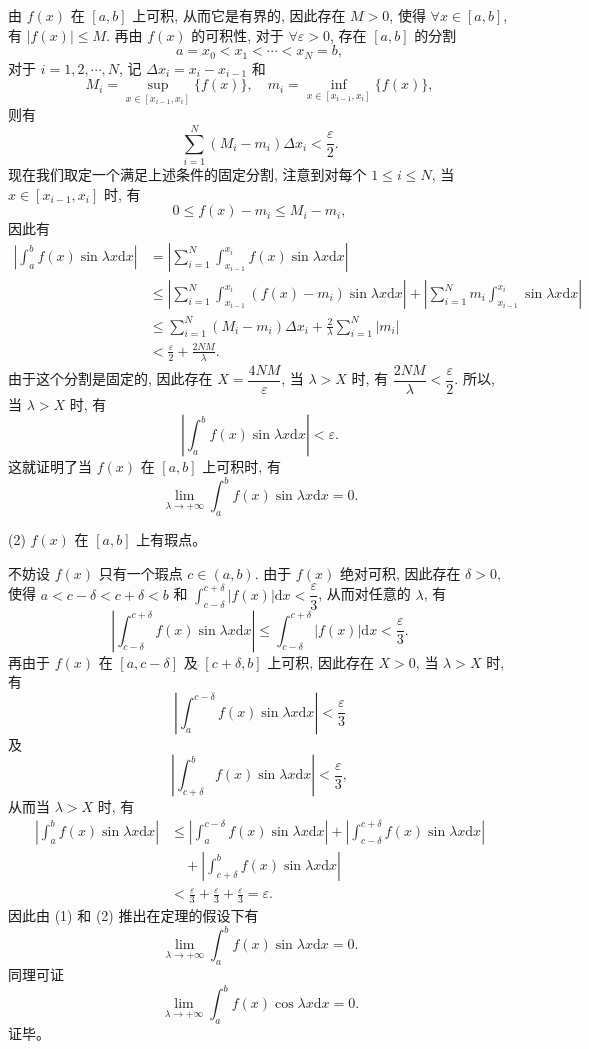 \documentclass[UTF8,12pt,a4paper,fontset=fandol]{ctexart}
\begin{document}
由 $f(x)$ 在 $[a,b]$ 上可积, 从而它是有界的, 因此存在 $M>0$, 使得 $\forall x\in[a,b]$, 有 $|f(x)|\leqslant M$. 再由 $f(x)$ 的可积性, 对于 $\forall\varepsilon>0$, 存在 $[a,b]$ 的分割
\[
  a=x_0<x_1<\cdots<x_N=b,
\]
对于 $i=1,2,\cdots,N$, 记 $\Delta x_i=x_i-x_{i-1}$ 和
\[
  M_i=\sup_{x\in[x_{i-1},x_i]}\{f(x)\},\quad
  m_i=\inf_{x\in[x_{i-1},x_i]}\{f(x)\},
\]
则有
\[
  \sum_{i=1}^N(M_i-m_i)\Delta x_i<\frac{\varepsilon}{2}.
\]
现在我们取定一个满足上述条件的固定分割, 注意到对每个 $1\leqslant i\leqslant N$, 当 $x\in[x_{i-1},x_i]$ 时, 有
\[
  0\leqslant f(x)-m_i\leqslant M_i-m_i,
\]
因此有
\[
\begin{aligned}
  \left|\int_a^b f(x)\sin\lambda x\mathrm dx\right|
  &=\left|\sum_{i=1}^N\int_{x_{i-1}}^{x_i}f(x)\sin\lambda x\mathrm dx\right|\\
  &\leqslant\left|\sum_{i=1}^N\int_{x_{i-1}}^{x_i}(f(x)-m_i)\sin\lambda x\mathrm dx\right|
    +\left|\sum_{i=1}^N m_i\int_{x_{i-1}}^{x_i}\sin\lambda x\mathrm dx\right|\\
  &\leqslant\sum_{i=1}^N(M_i-m_i)\Delta x_i+\frac2\lambda\sum_{i=1}^N|m_i|\\
  &<\frac{\varepsilon}{2}+\frac{2NM}{\lambda}.
\end{aligned}
\]
由于这个分割是固定的, 因此存在 $X=\dfrac{4NM}{\varepsilon}$, 当 $\lambda>X$ 时, 有 $\dfrac{2NM}{\lambda}<\dfrac{\varepsilon}{2}$. 所以, 当 $\lambda>X$ 时, 有
\[
  \left|\int_a^b f(x)\sin\lambda x\mathrm dx\right|<\varepsilon.
\]
这就证明了当 $f(x)$ 在 $[a,b]$ 上可积时, 有
\[
  \lim_{\lambda\to+\infty}\int_a^b f(x)\sin\lambda x\mathrm dx=0.
\]

(2) $f(x)$ 在 $[a,b]$ 上有瑕点。

不妨设 $f(x)$ 只有一个瑕点 $c\in(a,b)$. 由于 $f(x)$ 绝对可积, 因此存在 $\delta>0$, 使得 $a<c-\delta<c+\delta<b$ 和 $\int_{c-\delta}^{c+\delta}|f(x)|\mathrm dx<\dfrac{\varepsilon}{3}$, 从而对任意的 $\lambda$, 有
\[
  \left|\int_{c-\delta}^{c+\delta}f(x)\sin\lambda x\mathrm dx\right|
  \leqslant\int_{c-\delta}^{c+\delta}|f(x)|\mathrm dx<\frac{\varepsilon}{3}.
\]
再由于 $f(x)$ 在 $[a,c-\delta]$ 及 $[c+\delta,b]$ 上可积, 因此存在 $X>0$, 当 $\lambda>X$ 时, 有
\[
  \left|\int_a^{c-\delta}f(x)\sin\lambda x\mathrm dx\right|<\frac{\varepsilon}{3}
\]
及
\[
  \left|\int_{c+\delta}^b f(x)\sin\lambda x\mathrm dx\right|<\frac{\varepsilon}{3},
\]
从而当 $\lambda>X$ 时, 有
\[
\begin{aligned}
  \left|\int_a^b f(x)\sin\lambda x\mathrm dx\right|
  &\leqslant\left|\int_a^{c-\delta}f(x)\sin\lambda x\mathrm dx\right|
    +\left|\int_{c-\delta}^{c+\delta}f(x)\sin\lambda x\mathrm dx\right|\\
  &\quad+\left|\int_{c+\delta}^b f(x)\sin\lambda x\mathrm dx\right|\\
  &<\frac{\varepsilon}{3}+\frac{\varepsilon}{3}+\frac{\varepsilon}{3}=\varepsilon.
\end{aligned}
\]
因此由 (1) 和 (2) 推出在定理的假设下有
\[
  \lim_{\lambda\to+\infty}\int_a^b f(x)\sin\lambda x\mathrm dx=0.
\]
同理可证
\[
  \lim_{\lambda\to+\infty}\int_a^b f(x)\cos\lambda x\mathrm dx=0.
\]
证毕。
\end{document}

